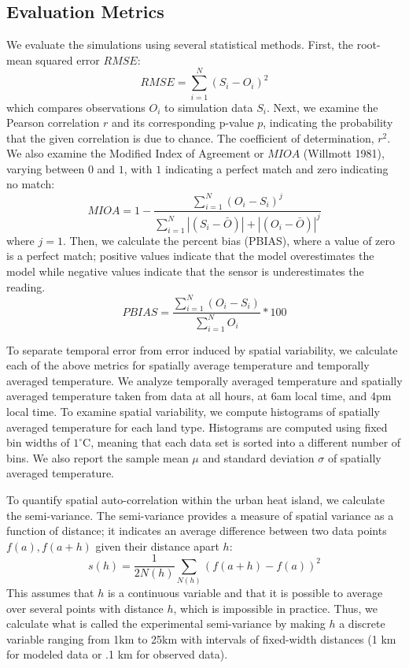 \subsection{Evaluation Metrics}
\label{sec:methods_evaluation}
We evaluate the simulations using several statistical methods. 
First, the root-mean squared error $RMSE$:  
\begin{equation}%
RMSE = \sum_{i=1}^{N} \left(S_i - O_i\right)^2
\end{equation}
which compares observations $O_i$ to simulation data $S_i$.
Next, we examine the Pearson correlation $r$ and its corresponding p-value $p$, indicating the probability that the given correlation is due to chance. The coefficient of determination, $r^2$. We also examine the Modified Index of Agreement or $MIOA$ (Willmott 1981), varying between \(0\) and \(1\), with \(1\) indicating a perfect match and zero indicating no match: 
\begin{equation}
MIOA = 1 - \frac{\sum_{i=1}^{N}(O_{i}-S_{i})^{j}}{\sum_{i=1}^{N}|(S_{i}-\bar{O})|+|(O_{i}-\bar{O})|^{j}}
\end{equation}
where $j=1$. 
Then, we calculate the percent bias (PBIAS), where a value of zero is a perfect match; positive values indicate that the model overestimates the model while negative values indicate that the sensor is underestimates the reading.
\begin{equation}
PBIAS = \frac{\sum_{i=1}^{N}(O_{i}-S_{i})}{\sum_{i=1}^{N}O_{i}}*100
\end{equation}

To separate temporal error from error induced by spatial variability, we calculate each of the above metrics for spatially average temperature and temporally averaged temperature. We analyze temporally averaged temperature and spatially averaged temperature taken from data at all hours, at 6am local time, and 4pm local time. 
To examine spatial variability, we compute histograms of spatially averaged temperature for each land type. Histograms are computed using fixed bin widths of $1^\circ$C, meaning that each data set is sorted into a different number of bins. We also report the sample mean $\mu$ and standard deviation $\sigma$ of spatially averaged temperature. 

To quantify spatial auto-correlation within the urban heat island, we calculate the semi-variance. The semi-variance provides a measure of spatial variance as a function of distance; it indicates an average difference between two data points $f(a), f(a+h)$ given their distance apart $h$: 
\begin{equation}
 s(h) = \frac{1}{2 N(h)} \sum _{N(h)} \left(f(a+h) -f(a)\right)^2
\label{eq:semivariance}
\end{equation}
This assumes that $h$ is a continuous variable and that it is possible to average over several points with distance $h$, which is impossible in practice. Thus, we calculate what is called the experimental semi-variance by making $h$ a discrete variable ranging from 1km to 25km with intervals of fixed-width distances (1 km for modeled data or .1 km for observed data). 

